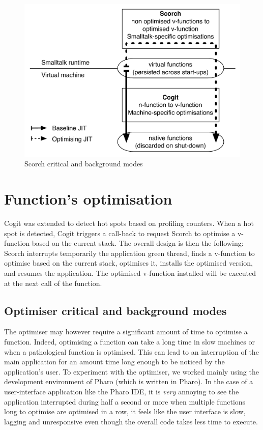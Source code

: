 \documentclass[a4paper,12pt,twoside]{../includes/ThesisStyle}
\begin{document}
\begin{figure}[h!]
    \begin{center}
        \includegraphics[width=0.8\linewidth]{OptArchitecture}
        \caption{Scorch critical and background modes}
        \label{fig:ScorchModes}
    \end{center}
\end{figure}


\section {Function's optimisation}

Cogit was extended to detect hot spots based on profiling counters. When a hot spot is detected, Cogit triggers a call-back to request Scorch to optimise a v-function based on the current stack. The overall design is then the following: Scorch interrupts temporarily the application green thread, finds a v-function to optimise based on the current stack, optimises it, installs the optimised version, and resumes the application. The optimised v-function installed will be executed at the next call of the function.

\subsection{Optimiser critical and background modes}

The optimiser may however require a significant amount of time to optimise a function. Indeed, optimising a function can take a long time in slow machines or when a pathological function is optimised. This can lead to an interruption of the main application for an amount time long enough to be noticed by the application's user. To experiment with the optimiser, we worked mainly using the development environment of Pharo (which is written in Pharo). In the case of a user-interface application like the Pharo IDE, it is \emph{very} annoying to see the application interrupted during half a second or more when multiple functions long to optimise are optimised in a row, it feels like the user interface is slow, lagging and unresponsive even though the overall code takes less time to execute.
\end{document}
